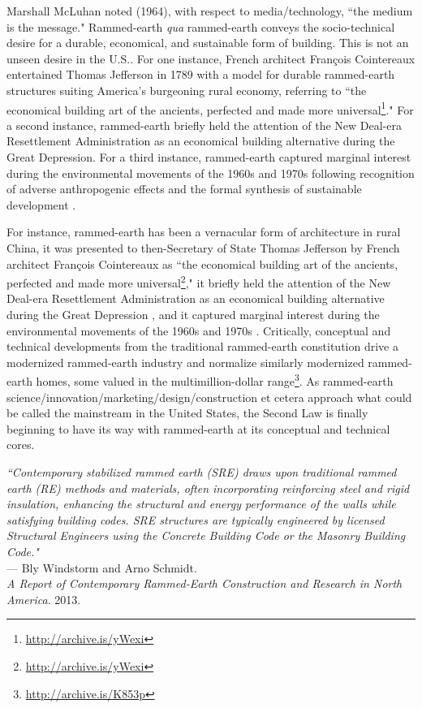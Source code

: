Marshall McLuhan noted (1964), with respect to media/technology, ``the medium is the message." Rammed-earth \textit{qua} rammed-earth conveys the socio-technical desire for a durable, economical, and sustainable form of building. This is not an unseen desire in the U.S.. For one instance, French architect Fran\c cois Cointereaux entertained Thomas Jefferson in 1789 with a model for durable rammed-earth structures suiting America's burgeoning rural economy, referring to ``the economical building art of the ancients, perfected and made more universal\footnote{\url{http://archive.is/yWexi}}." For a second instance, rammed-earth briefly held the attention of the New Deal-era Resettlement Administration as an economical building alternative during the Great Depression. For a third instance, rammed-earth captured marginal interest during the environmental movements of the 1960s and 1970s following recognition of adverse anthropogenic effects and the formal synthesis of sustainable development \cite{GARDENDALE}.







For instance, rammed-earth has been a vernacular form of architecture in rural China, it was presented to then-Secretary of State Thomas Jefferson by French architect Fran\c cois Cointereaux as ``the economical building art of the ancients, perfected and made more universal\footnote{\url{http://archive.is/yWexi}}," it briefly held the attention of the New Deal-era Resettlement Administration as an economical building alternative during the Great Depression \cite{GARDENDALE}, and it captured marginal interest during the environmental movements of the 1960s and 1970s \cite{GARDENDALE}. Critically, conceptual and technical developments from the traditional rammed-earth constitution drive a modernized rammed-earth industry and normalize similarly modernized rammed-earth homes, some valued in the multimillion-dollar range\footnote{\url{http://archive.is/K853p}}. As rammed-earth science/innovation/marketing/design/construction et cetera approach what could be called the mainstream in the United States, the Second Law is finally beginning to have its way with rammed-earth at its conceptual and technical cores.

\begin{flushright}
\small{
\textit{
``Contemporary stabilized rammed earth (SRE) draws upon traditional rammed earth (RE) methods and materials, often incorporating reinforcing steel and rigid insulation, enhancing the structural and energy performance of the walls while satisfying building codes. SRE structures are typically engineered by licensed Structural Engineers using the Concrete Building Code or the Masonry Building Code."}} \\ --- Bly Windstorm and Arno Schmidt. \\ \textit{A Report of Contemporary Rammed-Earth Construction and Research in North America}. 2013.
\end{flushright}

